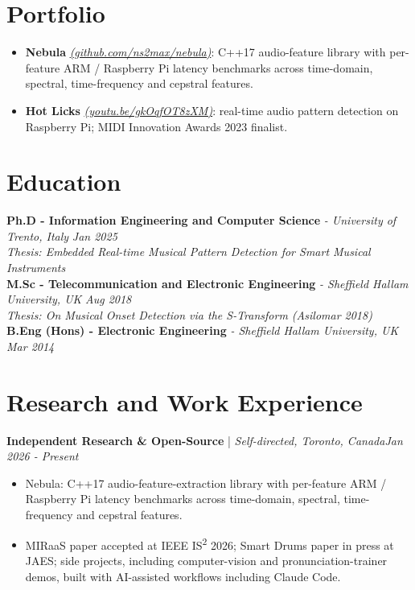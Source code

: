 \documentclass[11pt]{article}
\newenvironment{cvrole}[5]{%
  \par\noindent\textbf{\large #1} | \textit{\small #2, #3}\hfill \textit{\small #4 - #5}\par
  \begin{itemize}[leftmargin=2em, itemsep=-0.3em, topsep=-0.5em]%
}{%
  \end{itemize}\par\noindent\mbox{}\par\vspace{0.1em}%
}
\begin{document}
\section*{Portfolio \footnotesize {}}
\begin{itemize}[leftmargin=1.2em, itemsep=-0.25em]
    \item \textbf{Nebula} \href{https://github.com/ns2max/nebula}{\textit{(github.com/ns2max/nebula)}}: C++17 audio-feature library with per-feature ARM / Raspberry Pi latency benchmarks across time-domain, spectral, time-frequency and cepstral features.
    \item \textbf{Hot Licks} \href{https://youtu.be/gkOqfOT8zXM}{\textit{(youtu.be/gkOqfOT8zXM)}}: real-time audio pattern detection on Raspberry Pi; MIDI Innovation Awards 2023 finalist.
\end{itemize}

\section*{Education}
\textbf{Ph.D - Information Engineering and Computer Science} \textit{\small{ - University of Trento, Italy}} \hfill \textit{Jan 2025}\\[2pt]
\noindent\textit{\small Thesis: Embedded Real-time Musical Pattern Detection for Smart Musical Instruments}\\[3pt]
\noindent\textbf{M.Sc - Telecommunication and Electronic Engineering} \textit{\small{ - Sheffield Hallam University, UK}} \hfill \textit{Aug 2018}\\[2pt]
\noindent\textit{\small Thesis: On Musical Onset Detection via the S-Transform (Asilomar 2018)}\\[3pt]
\noindent\textbf{B.Eng (Hons) - Electronic Engineering} \textit{\small{ - Sheffield Hallam University, UK}} \hfill \textit{Mar 2014}

\section*{Research and Work Experience}

\begin{cvrole}{Independent Research \& Open-Source}{Self-directed}{Toronto, Canada}{Jan 2026}{Present}
    \item Nebula: C++17 audio-feature-extraction library with per-feature ARM / Raspberry Pi latency benchmarks across time-domain, spectral, time-frequency and cepstral features.
    \item MIRaaS paper accepted at IEEE IS\textsuperscript{2} 2026; Smart Drums paper in press at JAES; side projects, including computer-vision and pronunciation-trainer demos, built with AI-assisted workflows including Claude Code.
\end{cvrole}
\end{document}
